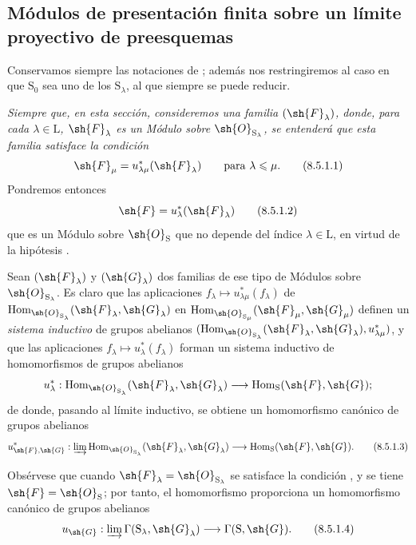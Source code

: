 \subsection{Módulos de presentación finita sobre un límite proyectivo de preesquemas}
\label{subsection:IV.8.5}

\begin{env}[8.5.1]
\label{IV.8.5.1}
Conservamos siempre las notaciones de ; además nos restringiremos al caso en que $\mathrm{S}_0$ sea uno de los $\mathrm{S}_\lambda$, al que siempre se puede reducir.

\emph{Siempre que, en esta sección, consideremos una familia $(\sh{F}_\lambda)$, donde, para cada $\lambda\in\mathrm{L}$, $\sh{F}_\lambda$ es un Módulo sobre $\sh{O}_{\mathrm{S}_\lambda}$, se entenderá que esta familia satisface la condición}
\begin{equation}
  \sh{F}_\mu=u_{\lambda\mu}^*(\sh{F}_\lambda) \qquad\text{para }\lambda\leqslant\mu.
  \tag{8.5.1.1}
\label{IV.8.5.1.1}
\end{equation}
Pondremos entonces
\begin{equation}
  \sh{F}=u_\lambda^*(\sh{F}_\lambda)
  \label{IV.8.5.1.2}
\tag{8.5.1.2}
\end{equation}
que es un Módulo sobre $\sh{O}_\mathrm{S}$ que no depende del índice $\lambda\in\mathrm{L}$, en virtud de la hipótesis .

Sean $(\sh{F}_\lambda)$ y $(\sh{G}_\lambda)$ dos familias de ese tipo de Módulos sobre $\sh{O}_{\mathrm{S}_\lambda}$.
Es claro que las aplicaciones $f_\lambda\mapsto u_{\lambda\mu}^*(f_\lambda)$ de $\operatorname{Hom}_{\sh{O}_{\mathrm{S}_\lambda}}(\sh{F}_\lambda,\sh{G}_\lambda)$ en $\operatorname{Hom}_{\sh{O}_{\mathrm{S}_\mu}}(\sh{F}_\mu,\sh{G}_\mu)$ definen un \emph{sistema inductivo} de grupos abelianos $(\operatorname{Hom}_{\sh{O}_{\mathrm{S}_\lambda}}(\sh{F}_\lambda,\sh{G}_\lambda),u_{\lambda\mu}^*)$, y que las aplicaciones $f_\lambda\mapsto u_\lambda^*(f_\lambda)$ forman un sistema inductivo de homomorfismos de grupos abelianos
\[
  u_\lambda^*:\operatorname{Hom}_{\sh{O}_{\mathrm{S}_\lambda}}(\sh{F}_\lambda,\sh{G}_\lambda)\to\operatorname{Hom}_\mathrm{S}(\sh{F},\sh{G});
\]
de donde, pasando al límite inductivo, se obtiene un homomorfismo canónico de grupos abelianos
\begin{equation}
  u_{\sh{F},\sh{G}}^*:\varinjlim\operatorname{Hom}_{\sh{O}_{\mathrm{S}_\lambda}}(\sh{F}_\lambda,\sh{G}_\lambda)\to\operatorname{Hom}_\mathrm{S}(\sh{F},\sh{G}).
  \tag{8.5.1.3}
\label{IV.8.5.1.3}
\end{equation}

Obsérvese que cuando $\sh{F}_\lambda=\sh{O}_{\mathrm{S}_\lambda}$ se satisface la condición , y se tiene $\sh{F}=\sh{O}_\mathrm{S}$; por tanto, el homomorfismo  proporciona  un homomorfismo canónico de grupos abelianos
\begin{equation}
  u_{\sh{G}}:\varinjlim\Gamma(\mathrm{S}_\lambda,\sh{G}_\lambda)\to\Gamma(\mathrm{S},\sh{G}).
  \tag{8.5.1.4}
\label{IV.8.5.1.4}
\end{equation}
\end{env}

